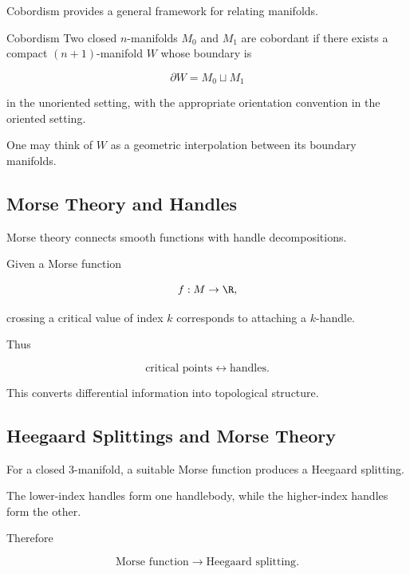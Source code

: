 Cobordism provides a general framework for relating manifolds.

\begin{definitionbox}{Cobordism}
Two closed \(n\)-manifolds \(M_0\) and \(M_1\) are cobordant if there exists
a compact \((n+1)\)-manifold \(W\) whose boundary is

\[
\boxed{
\partial W
=
M_0\sqcup M_1
}
\]

in the unoriented setting, with the appropriate orientation convention in
the oriented setting.
\end{definitionbox}

One may think of \(W\) as a geometric interpolation between its boundary
manifolds.

\subsection{Morse Theory and Handles}
\label{subsec:morse-theory-low-dimensional}

Morse theory connects smooth functions with handle decompositions.

Given a Morse function

\[
f:M\to\R,
\]

crossing a critical value of index \(k\) corresponds to attaching a
\(k\)-handle.

Thus

\[
\boxed{
\text{critical points}
\longleftrightarrow
\text{handles}.
}
\]

This converts differential information into topological structure.

\subsection{Heegaard Splittings and Morse Theory}
\label{subsec:heegaard-morse}

For a closed \(3\)-manifold, a suitable Morse function produces a Heegaard
splitting.

The lower-index handles form one handlebody, while the higher-index handles
form the other.

Therefore

\[
\boxed{
\text{Morse function}
\longrightarrow
\text{Heegaard splitting}.
}
\]

